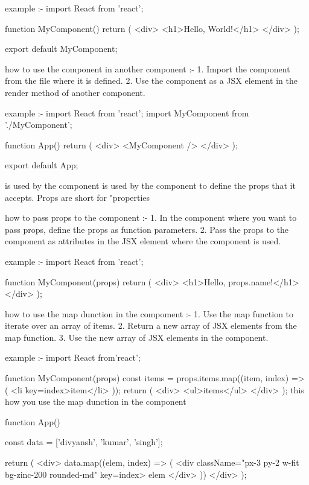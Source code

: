 example :-
import React from 'react';

function MyComponent() {
  return (
    <div>
      <h1>Hello, World!</h1>
    </div>
  );
}

export default MyComponent;

how to use the component in another component :-
1. Import the component from the file where it is defined.
2. Use the component as a JSX element in the render method of another component.

example :-
import React from 'react';
import MyComponent from './MyComponent';

function App() {
  return (
    <div>
      <MyComponent />
    </div>
    );
}

export default App;

{} is used by the component
{} is used by the component to define the props that it accepts. Props are short for "properties

how to pass props to the component :-
1. In the component where you want to pass props, define the props as function parameters.
2. Pass the props to the component as attributes in the JSX element where the component is used.

example :-
import React from 'react';

function MyComponent(props) {
  return (
    <div>
      <h1>Hello, {props.name}!</h1>
    </div>
  );
}

how to use the map dunction in the compoment :-
1. Use the map function to iterate over an array of items.
2. Return a new array of JSX elements from the map function.
3. Use the new array of JSX elements in the component.

example :-
import React from'react';

function MyComponent(props) {
  const items = props.items.map((item, index) => (
    <li key={index}>{item}</li>
  ));
  return (
    <div>
      <ul>{items}</ul>
    </div>
  );
}
this how you use the map dunction in the component 


function App() {
  const data = ['divyansh', 'kumar', 'singh'];
  
  return (
    <div>
      {data.map((elem, index) => (
        <div className="px-3 py-2 w-fit bg-zinc-200 rounded-md" key={index}>
          {elem}
        </div>
      ))}
    </div>
  );
}